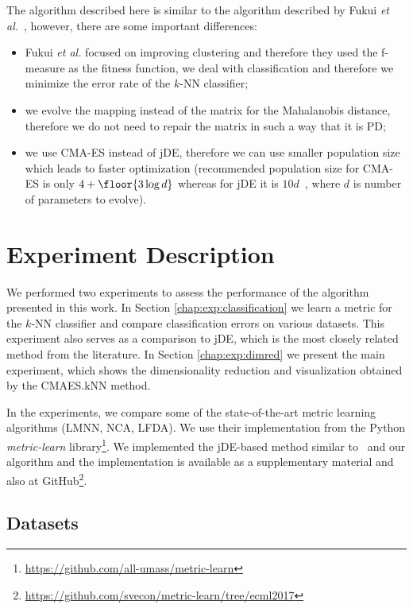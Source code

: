 The algorithm described here is similar to the algorithm described by Fukui \emph{et al.}~\cite{fukui2013evolutionary}, however, there are some important differences:
\begin{itemize}
\item Fukui \emph{et al.} focused on improving clustering and therefore they used the f-measure as the fitness function, we deal with classification and therefore we minimize the error rate of the $k$-NN classifier;
\item we evolve the mapping instead of the matrix for the Mahalanobis distance, therefore we do not need to repair the matrix in such a way that it is PD;
\item we use CMA-ES instead of jDE, therefore we can use smaller population size which leads to faster optimization (recommended population size for CMA-ES is only $4+\floor{3\log{d}}$ \cite{hansen2006cma} whereas for jDE it is $10d$~\cite{brest2006self}, where $d$ is number of parameters to evolve).
\end{itemize}

\section{Experiment Description}

We performed two experiments to assess the performance of the algorithm presented in this work. In Section \ref{chap:exp:classification} we learn a metric for the $k$-NN classifier and compare classification errors on various datasets. This experiment also serves as a comparison to jDE, which is the most closely related method from the literature. In Section \ref{chap:exp:dimred} we present the main experiment, which shows the dimensionality reduction and visualization obtained by the CMAES.kNN method.

In the experiments, we compare some of the state-of-the-art metric learning algorithms (LMNN, NCA, LFDA). We use their implementation from the Python \textit{metric-learn} library\footnote{\url{https://github.com/all-umass/metric-learn}}. We implemented the jDE-based method similar to~\cite{fukui2013evolutionary} and our algorithm and the implementation is available as a supplementary material and also at GitHub\footnote{\url{https://github.com/svecon/metric-learn/tree/ecml2017}}.

\subsection{Datasets} \label{chap:exp:datasets}

